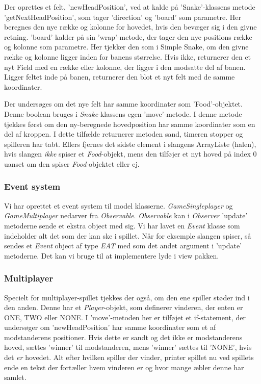 Der oprettes et felt, 'newHeadPosition', ved at kalde på 'Snake'-klassens metode 'getNextHeadPosition', som tager 'direction' og 'board' som parametre. Her beregnes den nye række og kolonne for hovedet, hvis den bevæger sig i den givne retning. 'board' kalder på sin 'wrap'-metode, der tager den nye positions række og kolonne som parametre. Her tjekker den som i Simple Snake, om den givne række og kolonne ligger inden for banens størrelse. Hvis ikke, returnerer den et nyt Field med en række eller kolonne, der ligger i den modsatte del af banen. Ligger feltet inde på banen, returnerer den blot et nyt felt med de samme koordinater.
\newline

Der undersøges om det nye felt har samme koordinater som 'Food'-objektet. Denne boolean bruges i \textit{Snake}-klassens egen 'move'-metode. I denne metode tjekkes først om den ny-beregnede hovedposition har samme koordinater som en del af kroppen. I dette tilfælde returnerer metoden sand, timeren stopper og spilleren har tabt. Ellers fjernes det sidste element i slangens ArrayListe (halen), hvis slangen \textit{ikke} spiser et \textit{Food}-objekt, mens den tilføjer et nyt hoved på index 0 uanset om den spiser \textit{Food}-objektet eller ej.
\newline

\subsubsection{Event system}
Vi har oprettet et event system til model klasserne. \textit{GameSingleplayer} og \textit{GameMultiplayer} nedarver fra \textit{Observable}. \textit{Observable} kan i \textit{Observer} 'update' metoderne sende et ekstra object med sig. Vi har lavet en \textit{Event} klasse som indeholder alt det som der kan ske i spillet. Når for eksemple slangen spiser, så sendes et \textit{Event} object af type \textit{EAT} med som det andet argument i 'update' metoderne. Det kan vi bruge til at implementere lyde i view pakken.
   
\subsubsection{Multiplayer}
Specielt for multiplayer-spillet tjekkes der også, om den ene spiller støder ind i den anden. Denne har et \textit{Player}-objekt, som definerer vinderen, der enten er ONE, TWO eller NONE. I 'move'-metoden her er tilføjet et if-statement, der undersøger om 'newHeadPosition' har samme koordinater som et af modstanderens positioner. Hvis dette er sandt og det ikke er modstanderens hoved, sættes 'winner' til modstanderen, mens 'winner' sættes til 'NONE', hvis det \textit{er} hovedet.
Alt efter hvilken spiller der vinder, printer spillet nu ved spillets ende en tekst der fortæller hvem vinderen er og hvor mange æbler denne har samlet.


